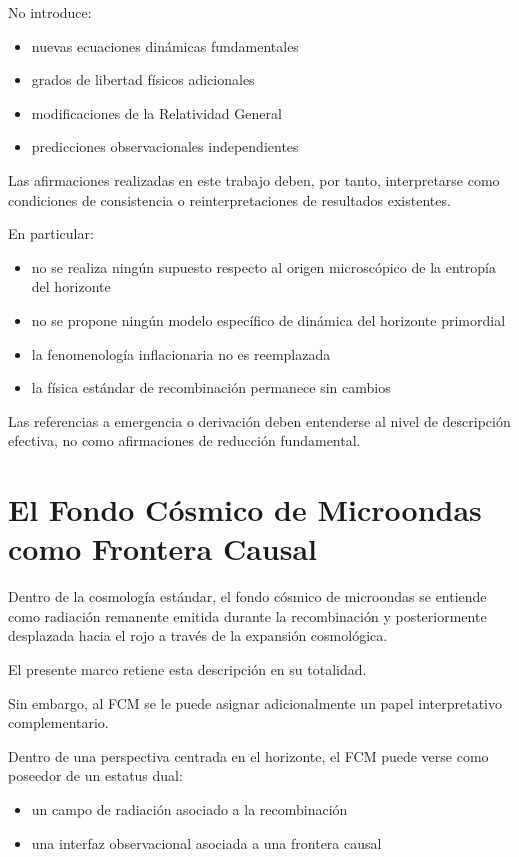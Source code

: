 \documentclass[12pt,a4paper]{article}
\begin{document}
No introduce:

\begin{itemize}
  \item nuevas ecuaciones dinámicas fundamentales
  \item grados de libertad físicos adicionales
  \item modificaciones de la Relatividad General
  \item predicciones observacionales independientes
\end{itemize}

Las afirmaciones realizadas en este trabajo deben, por tanto, interpretarse como condiciones de consistencia o reinterpretaciones de resultados existentes.

En particular:

\begin{itemize}
  \item no se realiza ningún supuesto respecto al origen microscópico de la entropía del horizonte
  \item no se propone ningún modelo específico de dinámica del horizonte primordial
  \item la fenomenología inflacionaria no es reemplazada
  \item la física estándar de recombinación permanece sin cambios
\end{itemize}

Las referencias a emergencia o derivación deben entenderse al nivel de descripción efectiva, no como afirmaciones de reducción fundamental.

\section{El Fondo Cósmico de Microondas como Frontera Causal}

Dentro de la cosmología estándar, el fondo cósmico de microondas se entiende como radiación remanente emitida durante la recombinación y posteriormente desplazada hacia el rojo a través de la expansión cosmológica.

El presente marco retiene esta descripción en su totalidad.

Sin embargo, al FCM se le puede asignar adicionalmente un papel interpretativo complementario.

Dentro de una perspectiva centrada en el horizonte, el FCM puede verse como poseedor de un estatus dual:

\begin{itemize}
  \item un campo de radiación asociado a la recombinación
  \item una interfaz observacional asociada a una frontera causal
\end{itemize}
\end{document}

